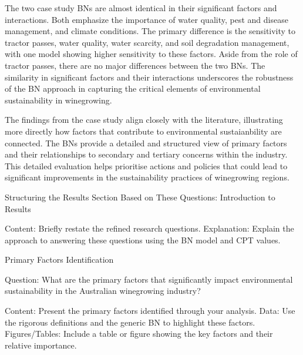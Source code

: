 
The two case study BNs are almost identical in their significant factors and interactions. Both emphasize the importance of water quality, pest and disease management, and climate conditions. The primary difference is the sensitivity to tractor passes, water quality, water scarcity, and soil degradation management, with one model showing higher sensitivity to these factors. Aside from the role of tractor passes, there are no major differences between the two BNs. The similarity in significant factors and their interactions underscores the robustness of the BN approach in capturing the critical elements of environmental sustainability in winegrowing.

The findings from the case study align closely with the literature, illustrating more directly how factors that contribute to environmental sustaianbility are connected. The BNs provide a detailed and structured view of primary factors and their relationships to secondary and tertiary concerns within the industry. This detailed evaluation helps prioritise actions and policies that could lead to significant improvements in the sustainability practices of winegrowing regions.

Structuring the Results Section Based on These Questions:
Introduction to Results

    Content: Briefly restate the refined research questions.
    Explanation: Explain the approach to answering these questions using the BN model and CPT values.

Primary Factors Identification

Question: What are the primary factors that significantly impact environmental sustainability in the Australian winegrowing industry?

    Content: Present the primary factors identified through your analysis.
    Data: Use the rigorous definitions and the generic BN to highlight these factors.
    Figures/Tables: Include a table or figure showing the key factors and their relative importance.

